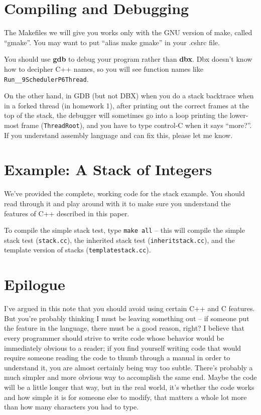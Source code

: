 \section{Compiling and Debugging}

The Makefiles we will give you works only with the GNU version of
make, called ``gmake''.  You may want
to put ``alias make gmake'' in your .cshrc file.

You should use {\bf gdb} to debug your program rather than {\bf dbx}.
Dbx doesn't know how to decipher C++ names, so you will see function
names like \verb+Run__9SchedulerP6Thread+.

On the other hand, in GDB (but not DBX) when you do a stack backtrace
when in a forked thread (in homework 1), after printing out the
correct frames at the top of the stack, the debugger will sometimes
go into a loop printing the lower-most frame ({\tt ThreadRoot}), and
you have to type control-C when it says ``more?''.  If you understand
assembly language and can fix this, please let me know.

\section{Example: A Stack of Integers}

We've provided the complete, working code for the stack example.  You should
read through it and play around with it to make sure you understand
the features of C++ described in this paper.

To compile the simple stack test, type {\tt make all} --
this will compile the simple stack test ({\tt stack.cc}),
the inherited stack test ({\tt inheritstack.cc}), and
the template version of stacks ({\tt templatestack.cc}).

\section{Epilogue}

I've argued in this note that you should avoid using certain C++
and C features.  But you're probably thinking I must be leaving
something out -- if someone put the
feature in the language, there must be a good reason, right?  I believe that
every programmer should strive to write code whose behavior would be
immediately obvious to a reader;
if you find yourself writing code that would require someone reading the code
to thumb through a manual in order to understand it, you are almost certainly
being way too subtle.  There's probably a much simpler and more obvious
way to accomplish the same end.  Maybe the code will be a little longer
that way,
but in the real world, it's whether the code works and how simple it is for
someone else to modify, that matters a whole lot more than how many
characters you had to type.

